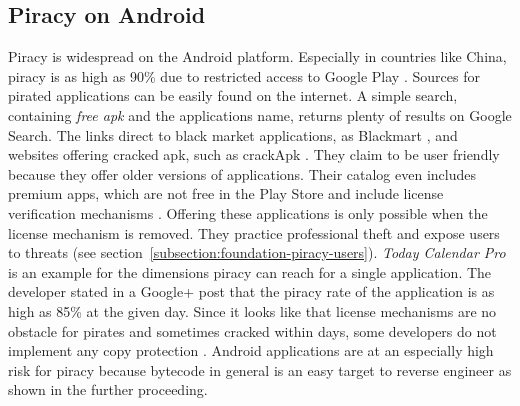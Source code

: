 \subsection{Piracy on Android} \label{subsection:foundation-piracy-android}
Piracy is widespread on the Android platform.
Especially in countries like China, piracy is as high as 90\% due to restricted access to Google Play \cite{piracyRate}.
Sources for pirated applications can be easily found on the internet.
A simple search, containing \textit{free apk} and the applications name, returns plenty of results on Google Search.
The links direct to black market applications, as Blackmart \cite{blackmartStore}, and websites offering cracked \gls{apk}, such as crackApk \cite{crackApk}.
They claim to be user friendly because they offer older versions of applications.
Their catalog even includes premium apps, which are not free in the Play Store and include license verification mechanisms \cite{apksfree}.
Offering these applications is only possible when the license mechanism is removed.
They practice professional theft and expose users to threats (see section~\ref{subsection:foundation-piracy-users}).
\newline
\textit{Today Calendar Pro} is an example for the dimensions piracy can reach for a single application.
The developer stated in a Google+ post that the piracy rate of the application is as high as 85\% at the given day. \cite{xdaPiracy} \cite{developersPiracy}
Since it looks like that license mechanisms are no obstacle for pirates and sometimes cracked within days, some developers do not implement any copy protection \cite{recodeMonument}.
\newline
Android applications are at an especially high risk for piracy because bytecode in general is an easy target to reverse engineer as shown in the further proceeding.
